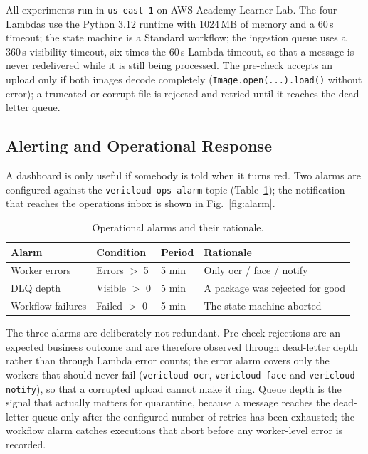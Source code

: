 All experiments run in \texttt{us-east-1} on AWS Academy Learner Lab. The four
Lambdas use the Python 3.12 runtime with 1024\,MB of memory and a 60\,s timeout;
the state machine is a Standard workflow; the ingestion queue uses a 360\,s
visibility timeout, six times the 60\,s Lambda timeout, so that a message is
never redelivered while it is still being processed. The pre-check accepts an
upload only if both images decode completely (\texttt{Image.open(...).load()}
without error); a truncated or corrupt file is rejected and retried until it
reaches the dead-letter queue.

\subsection{Alerting and Operational Response}\label{sec:alerting}

A dashboard is only useful if somebody is told when it turns red. Two alarms
are configured against the \texttt{vericloud-ops-alarm} topic
(Table~\ref{tab:alarms}); the notification that reaches the operations inbox is
shown in Fig.~\ref{fig:alarm}.

\begin{table}[htbp]
  \centering
  \small
  \caption{Operational alarms and their rationale.}
  \label{tab:alarms}
  \begin{tabular}{llll}
    \toprule
    Alarm & Condition & Period & Rationale \\
    \midrule
    Worker errors & Errors $>$ 5 & 5 min & Only ocr / face / notify \\
    DLQ depth & Visible $>$ 0 & 5 min & A package was rejected for good \\
    Workflow failures & Failed $>$ 0 & 5 min & The state machine aborted \\
    \bottomrule
  \end{tabular}
\end{table}

The three alarms are deliberately not redundant. Pre-check rejections are an
expected business outcome and are therefore observed through dead-letter depth
rather than through Lambda error counts; the error alarm covers only the workers
that should never fail (\texttt{vericloud-ocr}, \texttt{vericloud-face} and
\texttt{vericloud-notify}), so that a corrupted upload cannot make it ring.
Queue depth is the signal that actually matters for quarantine, because a message
reaches the dead-letter queue only after the configured number of retries has
been exhausted; the workflow alarm catches executions that abort before any
worker-level error is recorded.

